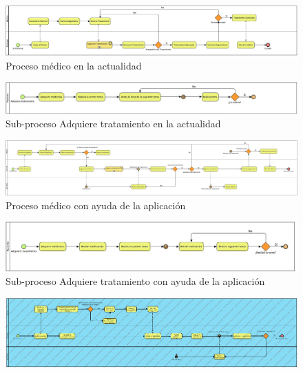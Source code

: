 \newpage
\begin{landscape}
	
\begin{figure}[htb]
	\centering
	\includegraphics[width=1.5\textwidth]{images/cap2/Proceso1}
	\caption{Proceso médico en la actualidad} \label{fig:proceso1}
\end{figure}
\newpage

\begin{figure}[htb]
	\centering
	\includegraphics[width=1.5\textwidth]{images/cap2/AdquiereTratamientoP1}
	\caption{Sub-proceso Adquiere tratamiento en la actualidad} \label{fig:subproceso1}
\end{figure}
\newpage
\begin{figure}[htb]
	\centering
	\includegraphics[width=1.5\textwidth]{images/cap2/Proceso2}
	\caption{Proceso médico con ayuda de la aplicación} \label{fig:proceso2}
\end{figure}
\newpage
\begin{figure}[htb]
	\centering
	\includegraphics[width=1.5\textwidth]{images/cap2/AdquiereTratamientoP2}
	\caption{Sub-proceso Adquiere tratamiento con ayuda de la aplicación} \label{fig:subproceso2}
\end{figure}
\newpage
\begin{figure}[htb]
	\centering
	\includegraphics[width=1.5\textwidth]{images/cap2/ProcesosDoctor}

\end{figure}
\end{landscape}
